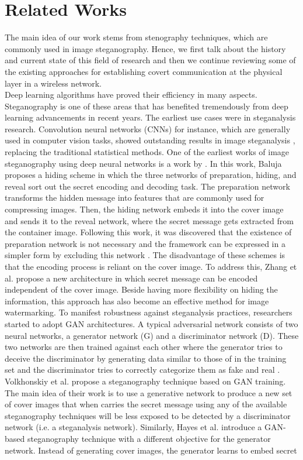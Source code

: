 \section{Related Works}
\label{s:related}
The main idea of our work stems from stenography techniques, which are commonly used in image steganography. Hence, we first talk about the history and current state of this field of research and then we continue reviewing some of the existing approaches for establishing covert communication at the physical layer in a wireless network.\\
Deep learning algorithms have proved their efficiency in many aspects. Steganography is one of these areas that has benefited tremendously from deep learning advancements in recent years. The earliest use cases were in steganalysis research. Convolution neural networks (CNNs) for instance, which are generally used in computer vision tasks, showed outstanding results in image steganalysis \cite{tan2014stacked,qian2015deep,xu2016structural}, replacing the traditional statistical methods. One of the earliest works of image steganography using deep neural networks is a work by \cite{baluja2017hiding}. In this work, Baluja proposes a hiding scheme in which the three networks of preparation, hiding, and reveal sort out the secret encoding and decoding task. The preparation network transforms the hidden message into features that are commonly used for compressing images. Then, the hiding network embeds it into the cover image and sends it to the reveal network, where the secret message gets extracted from the container image. Following this work, it was discovered that the existence of preparation network is not necessary and the framework can be expressed in a simpler form by excluding this network \cite{zhang2021brief}. The disadvantage of these schemes is that the encoding process is reliant on the cover image. To address this, Zhang et al. \cite{zhang2020udh} propose a new architecture in which secret message can be encoded independent of the cover image. Beside having more flexibility on hiding the information, this approach has also become an effective method for image watermarking. To manifest robustness against steganalysis practices, researchers started to adopt GAN architectures. A typical adversarial network consists of two neural networks, a generator network (G) and a discriminator network (D). These two networks are then trained against each other where the generator tries to deceive the discriminator by generating data similar to those of in the training set and the discriminator tries to correctly categorize them as fake and real \cite{goodfellow2014generative}. Volkhonskiy et al. \cite{volkhonskiy2020steganographic} propose a steganography technique based on GAN training. The main idea of their work is to use a generative network to produce a new set of cover images that when carries the secret message using any of the available steganography techniques will be less exposed to be detected by a discriminator network (i.e. a steganalysis network). Similarly, Hayes et al. \cite{hayes2017generating} introduce a GAN-based steganography technique with a different objective for the generator network. Instead of generating cover images, the generator learns to embed secret 